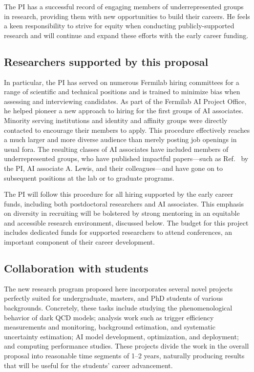 The PI has a successful record of engaging members of underrepresented groups in research,
providing them with new opportunities to build their careers.
He feels a keen responsibility to strive for equity when conducting publicly-supported research
and will continue and expand these efforts with the early career funding.

\subsection{Researchers supported by this proposal}

In particular, the PI has served on numerous Fermilab hiring committees for a range of scientific and technical positions
and is trained to minimize bias when assessing and interviewing candidates.
As part of the Fermilab AI Project Office, he helped pioneer a new approach to hiring for the first groups of AI associates.
Minority serving institutions and identity and affinity groups were directly contacted to encourage their members to apply.
This procedure effectively reaches a much larger and more diverse audience than merely posting job openings in usual fora.
The resulting classes of AI associates have included members of underrepresented groups,
who have published impactful papers---such as Ref.~\cite{Ciprijanovic:2023hrw} by the PI,
AI associate A. Lewis, and their colleagues---and have gone on to subsequent positions at the lab or to graduate programs.

The PI will follow this procedure for all hiring supported by the early career funds,
including both postdoctoral researchers and AI associates.
This emphasis on diversity in recruiting will be bolstered by strong mentoring
in an equitable and accessible research environment, discussed below.
The budget for this project includes dedicated funds for supported researchers to attend conferences,
an important component of their career development.

\subsection{Collaboration with students}

The new research program proposed here incorporates several novel projects
perfectly suited for undergraduate, masters, and PhD students of various backgrounds.
Concretely, these tasks include studying the phenomenological behavior of dark QCD models;
analysis work such as trigger efficiency measurements and monitoring, background estimation, and systematic uncertainty estimation;
AI model development, optimization, and deployment; and computing performance studies.
These projects divide the work in the overall proposal into reasonable time segments of 1--2 years,
naturally producing results that will be useful for the students' career advancement.


